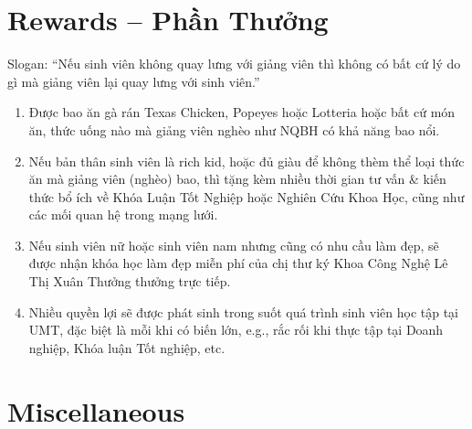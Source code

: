 \documentclass{article}
\begin{document}
\section{Rewards -- Phần Thưởng}
Slogan: ``Nếu sinh viên không quay lưng với giảng viên thì không có bất cứ lý do gì mà giảng viên lại quay lưng với sinh viên.''
\begin{enumerate}
    \item Được bao ăn gà rán Texas Chicken, Popeyes hoặc Lotteria hoặc bất cứ món ăn, thức uống nào mà giảng viên nghèo như NQBH có khả năng bao nổi.
    \item Nếu bản thân sinh viên là rich kid, hoặc đủ giàu để không thèm thể loại thức ăn mà giảng viên (nghèo) bao, thì tặng kèm nhiều thời gian tư vấn \& kiến thức bổ ích về Khóa Luận Tốt Nghiệp hoặc Nghiên Cứu Khoa Học, cũng như các mối quan hệ trong mạng lưới.
    \item Nếu sinh viên nữ hoặc sinh viên nam nhưng cũng có nhu cầu làm đẹp, sẽ được nhận khóa học làm đẹp miễn phí của chị thư ký Khoa Công Nghệ {\sc Lê Thị Xuân Thưởng} thưởng trực tiếp.
    \item Nhiều quyền lợi sẽ được phát sinh trong suốt quá trình sinh viên học tập tại UMT, đặc biệt là mỗi khi có biến lớn, e.g., rắc rối khi thực tập tại Doanh nghiệp, Khóa luận Tốt nghiệp, etc.
\end{enumerate}


\section{Miscellaneous}


\printbibliography[heading=bibintoc]
    
\end{document}
